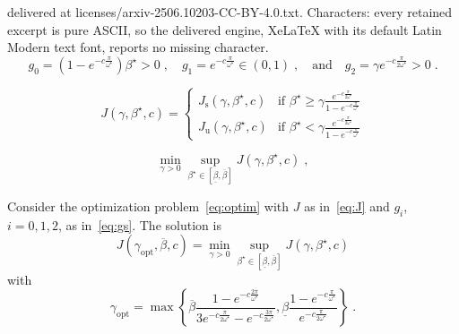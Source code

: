 \documentclass[10pt,a4paper]{amsart}
\newcommand{\opt}{\mathrm{opt}}
\newcommand{\rs}{\mathrm{s}}
\newcommand{\ru}{\mathrm{u}}
\begin{document}
delivered at licenses/arxiv-2506.10203-CC-BY-4.0.txt. Characters: every retained excerpt is pure ASCII, so the delivered engine, XeLaTeX with its default Latin Modern text font, reports no missing character.
\begin{equation} \label{eq:gs}
    g_0 = (1 - e^{-c\frac{\pi}{\omega^\star}}) \beta^\star > 0 \;, \quad g_1 = e^{-c\frac{\pi}{\omega^\star}} \in (0,1) \;, \quad
        \text{and} \quad  g_2 = \gamma e^{-c\frac{\pi}{2\omega^\star}} > 0\;.
\end{equation}

\begin{equation} \label{eq:J} 
    J(\gamma,\beta^\star,c) = 
    \begin{cases}
        J_\rs(\gamma,\beta^\star,c) & \text{if $\beta^\star \ge \gamma\frac{e^{-c\frac{\pi}{2\omega^\star}}}{1 - e^{-c\frac{\pi}{\omega^\star}}}$} \\
        J_\ru(\gamma,\beta^\star,c) & \text{if $\beta^\star < \gamma\frac{e^{-c\frac{\pi}{2\omega^\star}}}{1 - e^{-c\frac{\pi}{\omega^\star}}}$}
    \end{cases}
\end{equation}

\begin{equation} \label{eq:optim}
    \min_{\gamma > 0} \sup_{\beta^\star \in [\underline{\beta}, \overline{\beta}]} J(\gamma,\beta^\star,c) \;,
\end{equation}

\begin{proposition} \label{prop:optimization}
    Consider the optimization problem~\eqref{eq:optim} with $J$ as in~\eqref{eq:J} and $g_i$, $i = 0,1,2$, as in~\eqref{eq:gs}. The solution is 
    \begin{displaymath}
        J(\gamma_\opt,\overline{\beta},c) = \min_{\gamma > 0} \sup_{\beta^\star \in [\underline{\beta}, \overline{\beta}]} J(\gamma,\beta^\star,c)
    \end{displaymath}
    with
    \begin{equation} \label{eq:gamma_opt}
        \gamma_{\opt} = \max\left\{\overline{\beta}\frac{1 - e^{-c\frac{2\pi}{\omega^\star}}}{3e^{-c\frac{\pi}{2\omega^\star}} - e^{-c\frac{3\pi}{2\omega^\star}}},\underline{\beta}\frac{1 - e^{-c\frac{\pi}{\omega^\star}}}{e^{-c\frac{\pi}{2\omega^\star}}}\right\} \;.
    \end{equation}
\end{proposition}
\end{document}
